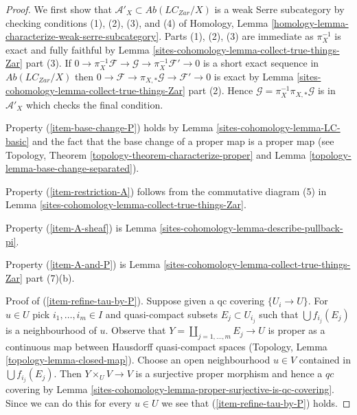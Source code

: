 \begin{proof}
We first show that $\mathcal{A}'_X \subset \textit{Ab}(\textit{LC}_{Zar}/X)$
is a weak Serre subcategory by checking conditions (1), (2), (3), and (4)
of Homology, Lemma \ref{homology-lemma-characterize-weak-serre-subcategory}.
Parts (1), (2), (3) are immediate as $\pi_X^{-1}$ is exact and
fully faithful by Lemma \ref{sites-cohomology-lemma-collect-true-things-Zar} part (3). If
$0 \to \pi_X^{-1}\mathcal{F} \to \mathcal{G} \to \pi_X^{-1}\mathcal{F}' \to 0$
is a short exact sequence in $\textit{Ab}(\textit{LC}_{Zar}/X)$
then $0 \to \mathcal{F} \to \pi_{X, *}\mathcal{G} \to \mathcal{F}' \to 0$
is exact by Lemma \ref{sites-cohomology-lemma-collect-true-things-Zar} part (2).
Hence $\mathcal{G} = \pi_X^{-1}\pi_{X, *}\mathcal{G}$ is in
$\mathcal{A}'_X$ which checks the final condition.

\medskip\noindent
Property (\ref{item-base-change-P}) holds by Lemma \ref{sites-cohomology-lemma-LC-basic}
and the fact that the base change of a proper map is a proper map (see
Topology, Theorem \ref{topology-theorem-characterize-proper} and
Lemma \ref{topology-lemma-base-change-separated}).

\medskip\noindent
Property (\ref{item-restriction-A}) follows from the commutative
diagram (5) in Lemma \ref{sites-cohomology-lemma-collect-true-things-Zar}.

\medskip\noindent
Property (\ref{item-A-sheaf}) is Lemma \ref{sites-cohomology-lemma-describe-pullback-pi}.

\medskip\noindent
Property (\ref{item-A-and-P}) is Lemma \ref{sites-cohomology-lemma-collect-true-things-Zar}
part (7)(b).

\medskip\noindent
Proof of (\ref{item-refine-tau-by-P}). Suppose given a qc covering
$\{U_i \to U\}$. For $u \in U$ pick $i_1, \ldots, i_m \in I$ and
quasi-compact subsets $E_j \subset U_{i_j}$ such that
$\bigcup f_{i_j}(E_j)$ is a neighbourhood of $u$.
Observe that $Y = \coprod_{j = 1, \ldots, m} E_j \to U$
is proper as a continuous map between Hausdorff quasi-compact spaces
(Topology, Lemma \ref{topology-lemma-closed-map}).
Choose an open neighbourhood $u \in V$ contained in $\bigcup f_{i_j}(E_j)$.
Then $Y \times_U V \to V$ is a surjective proper morphism and
hence a $qc$ covering by Lemma \ref{sites-cohomology-lemma-proper-surjective-is-qc-covering}.
Since we can do this for every $u \in U$ we see that
(\ref{item-refine-tau-by-P}) holds.
\end{proof}

